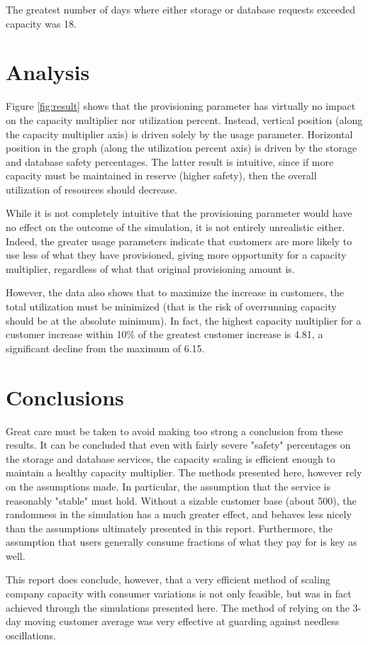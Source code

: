 \documentclass[12pt]{article} %
\begin{document}
    The greatest number of days where either storage or database requests exceeded capacity was 18.


\section{Analysis}
Figure \ref{fig:result} shows that the provisioning parameter has virtually no impact on the capacity multiplier nor utilization percent.  Instead, vertical position (along the capacity multiplier axis) is driven solely by the usage parameter.  Horizontal position in the graph (along the utilization percent axis) is driven by the storage and database safety percentages.  The latter result is intuitive, since if more capacity must be maintained in reserve (higher safety), then the overall utilization of resources should decrease.

While it is not completely intuitive that the provisioning parameter would have no effect on the outcome of the simulation, it is not entirely unrealistic either.  
Indeed, the greater usage parameters indicate that customers are more likely to use less of what they have provisioned, giving more opportunity for a capacity multiplier, regardless of what that original provisioning amount is.

However, the data also shows that to maximize the increase in customers, the total utilization must be minimized (that is the risk of overrunning capacity should be at the absolute minimum).  In fact, the highest capacity multiplier for a customer increase within 10\% of the greatest customer increase is 4.81, a significant decline from the maximum of 6.15.

\section{Conclusions}
Great care must be taken to avoid making too strong a conclusion from these results.  It can be concluded that even with fairly severe "safety" percentages on the storage and database services, the capacity scaling is efficient enough to maintain a healthy capacity multiplier.  The methods presented here, however rely on the assumptions made.  In particular, the assumption that the service is reasonably "stable" must hold.  Without a sizable customer base (about 500), the randomness in the simulation has a much greater effect, and behaves less nicely than the assumptions ultimately presented in this report.  Furthermore, the assumption that users generally consume fractions of what they pay for is key as well.

This report does conclude, however, that a very efficient method of scaling company capacity with consumer variations is not only feasible, but was in fact achieved through the simulations presented here.  
The method of relying on the 3-day moving customer average was very effective at guarding against needless oscillations.  
\end{document}
